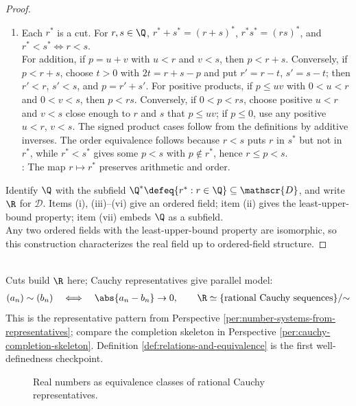 \begin{theorem}
\begin{proof}
\begin{enumerate}[label=(\roman*)]
\item {}
Each $r^*$ is a cut. For $r,s\in\Q$, $r^*+s^*=(r+s)^*$, $r^*s^*=(rs)^*$, and $r^*<s^*\Longleftrightarrow r<s$.\\
For addition, if $p=u+v$ with $u<r$ and $v<s$, then $p<r+s$. Conversely, if $p<r+s$, choose $t>0$ with $2t=r+s-p$ and put $r'=r-t$, $s'=s-t$; then $r'<r$, $s'<s$, and $p=r'+s'$. For positive products, if $p\leq uv$ with $0<u<r$ and $0<v<s$, then $p<rs$. Conversely, if $0<p<rs$, choose positive $u<r$ and $v<s$ close enough to $r$ and $s$ that $p\leq uv$; if $p\leq0$, use any positive $u<r$, $v<s$. The signed product cases follow from the definitions by additive inverses. The order equivalence follows because $r<s$ puts $r$ in $s^*$ but not in $r^*$, while $r^*<s^*$ gives some $p<s$ with $p\notin r^*$, hence $r\leq p<s$.\\
: The map $r\mapsto r^*$ preserves arithmetic and order.
\end{enumerate}
Identify $\Q$ with the subfield $\Q^*\defeq\{r^*:r\in\Q\}\subseteq\mathscr{D}$, and write $\R$ for $\mathscr{D}$. Items (i), (iii)--(vi) give an ordered field; item (ii) gives the least-upper-bound property; item (vii) embeds $\Q$ as a subfield.\\
Any two ordered fields with the least-upper-bound property are isomorphic, so this construction characterizes the real field up to ordered-field structure.
\end{proof}
\end{theorem}

\begin{perspective} \label{per:cauchy-construction-of-reals-parallel-model} \\
Cuts build $\R$ here; Cauchy representatives give parallel model:
\begin{align}
(a_n)\sim(b_n)\quad\Longleftrightarrow\quad \abs{a_n-b_n}\to0,\qquad
\R \simeq \{\text{rational Cauchy sequences}\}/{\sim} \nonumber
\end{align}
This is the representative pattern from Perspective \ref{per:number-systems-from-representatives}; compare the completion skeleton in Perspective \ref{per:cauchy-completion-skeleton}. Definition \ref{def:relations-and-equivalence} is the first well-definedness checkpoint.
\end{perspective}

\begin{figure}[H]
  \centering
  
  \caption{Real numbers as equivalence classes of rational Cauchy representatives.}
  \label{fig:cauchy-completion-formal-limits}
\end{figure}

